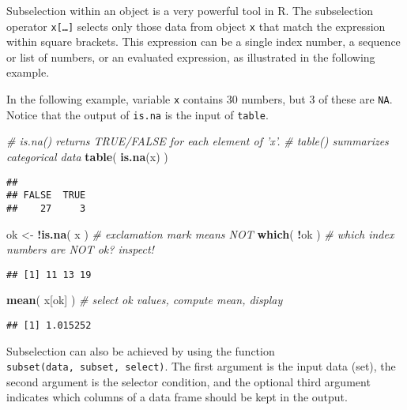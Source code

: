 \documentclass[]{book}
\newenvironment{Shaded}{\begin{snugshade}}{\end{snugshade}}
\newcommand{\CommentTok}[1]{\textcolor[rgb]{0.56,0.35,0.01}{\textit{#1}}}
\newcommand{\KeywordTok}[1]{\textcolor[rgb]{0.13,0.29,0.53}{\textbf{#1}}}
\newcommand{\NormalTok}[1]{#1}
\newcommand{\OperatorTok}[1]{\textcolor[rgb]{0.81,0.36,0.00}{\textbf{#1}}}
\newcommand{\StringTok}[1]{\textcolor[rgb]{0.31,0.60,0.02}{#1}}
\begin{document}
Subselection within an object is a very powerful tool in
R. The subselection operator \texttt{x{[}\ldots{}{]}} selects only those data from object \texttt{x}
that match the expression within square brackets. This expression can be a
single index number, a sequence or list of numbers, or an evaluated
expression, as illustrated in the following example.

In the following example, variable \texttt{x} contains
30 numbers, but 3 of these are \texttt{NA}. Notice that
the output of \texttt{is.na} is the input of
\texttt{table}.

\begin{Shaded}
\begin{Highlighting}[]
\CommentTok{# is.na() returns TRUE/FALSE for each element of ’x’. }
\CommentTok{# table() summarizes categorical data }
\KeywordTok{table}\NormalTok{( }\KeywordTok{is.na}\NormalTok{(x) ) }
\end{Highlighting}
\end{Shaded}

\begin{verbatim}
## 
## FALSE  TRUE 
##    27     3
\end{verbatim}

\begin{Shaded}
\begin{Highlighting}[]
\NormalTok{ok <-}\StringTok{ }\OperatorTok{!}\KeywordTok{is.na}\NormalTok{( x ) }\CommentTok{# exclamation mark means NOT }
\KeywordTok{which}\NormalTok{( }\OperatorTok{!}\NormalTok{ok ) }\CommentTok{# which index numbers are NOT ok? inspect! }
\end{Highlighting}
\end{Shaded}

\begin{verbatim}
## [1] 11 13 19
\end{verbatim}

\begin{Shaded}
\begin{Highlighting}[]
\KeywordTok{mean}\NormalTok{( x[ok] ) }\CommentTok{# select ok values, compute mean, display }
\end{Highlighting}
\end{Shaded}

\begin{verbatim}
## [1] 1.015252
\end{verbatim}

Subselection can also be achieved by using the function
\texttt{subset(data,\ subset,\ select)}. The first
argument is the input data (set), the second argument is the selector
condition, and the optional third argument indicates which columns of a
data frame should be kept in the output.
\end{document}
